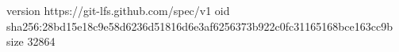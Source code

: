 version https://git-lfs.github.com/spec/v1
oid sha256:28bd15e18c9e58d6236d51816d6e3af6256373b922c0fc31165168bce163cc9b
size 32864
